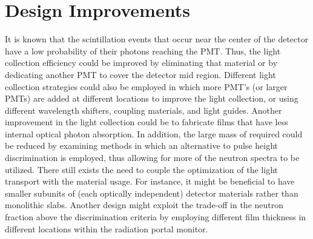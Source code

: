 \section{Design Improvements}
It is known that the scintillation events that occur near the center of the detector have a low probability of their photons reaching the PMT.
Thus, the light collection efficiency could be improved by eliminating that material or by dedicating another PMT to cover the detector mid region.
Different light collection strategies could also be employed in which more PMT's (or larger PMTs) are added at different locations to improve the light collection, or using different wavelength shifters, coupling materials, and light guides.
Another improvement in the light collection could be to fabricate films that have less internal optical photon absorption.
In addition, the large mass of  required could be reduced by examining methods in which an alternative to pulse height discrimination is employed, thus allowing for more of the neutron spectra to be utilized.
There still exists the need to couple the optimization of the light transport with the material usage.
For instance, it might be beneficial to have smaller subunits of (each optically independent) detector materials rather than monolithic slabs.
Another design might exploit the trade-off in the neutron fraction above the discrimination criteria by employing different film thickness in different locations within the radiation portal monitor.
